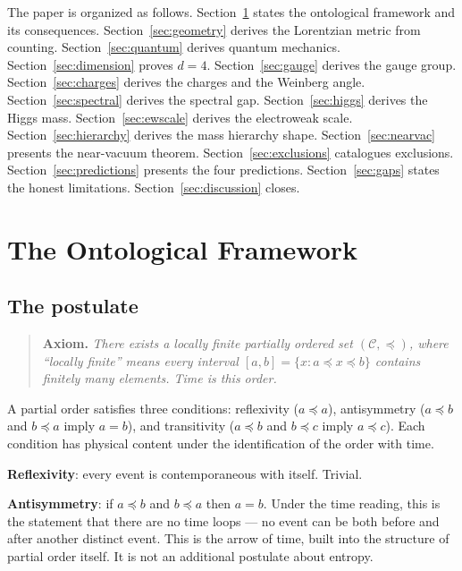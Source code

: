 \documentclass[11pt,letterpaper]{article}
\theoremstyle{remark}
\begin{document}
The paper is organized as follows. Section~\ref{sec:ontology} states
the ontological framework and its consequences. Section~\ref{sec:geometry}
derives the Lorentzian metric from counting. Section~\ref{sec:quantum}
derives quantum mechanics. Section~\ref{sec:dimension} proves $d = 4$.
Section~\ref{sec:gauge} derives the gauge group.
Section~\ref{sec:charges} derives the charges and the Weinberg angle.
Section~\ref{sec:spectral} derives the spectral gap.
Section~\ref{sec:higgs} derives the Higgs mass.
Section~\ref{sec:ewscale} derives the electroweak scale.
Section~\ref{sec:hierarchy} derives the mass hierarchy shape.
Section~\ref{sec:nearvac} presents the near-vacuum theorem.
Section~\ref{sec:exclusions} catalogues exclusions.
Section~\ref{sec:predictions} presents the four predictions.
Section~\ref{sec:gaps} states the honest limitations.
Section~\ref{sec:discussion} closes.

\section{The Ontological Framework}
\label{sec:ontology}

\subsection{The postulate}

\begin{quote}
\textbf{Axiom.} \emph{There exists a locally finite partially ordered
set $(\mathcal{C}, \preceq)$, where ``locally finite'' means every
interval $[a, b] = \{x : a \preceq x \preceq b\}$ contains finitely
many elements. Time is this order.}
\end{quote}

\noindent A partial order satisfies three conditions: reflexivity
($a \preceq a$), antisymmetry ($a \preceq b$ and $b \preceq a$ imply
$a = b$), and transitivity ($a \preceq b$ and $b \preceq c$ imply
$a \preceq c$). Each condition has physical content under the
identification of the order with time.

\textbf{Reflexivity}: every event is contemporaneous with itself.
Trivial.

\textbf{Antisymmetry}: if $a \preceq b$ and $b \preceq a$ then
$a = b$. Under the time reading, this is the statement that there
are no time loops — no event can be both before and after another
distinct event. This is the arrow of time, built into the structure
of partial order itself. It is not an additional postulate about
entropy.
\end{document}
